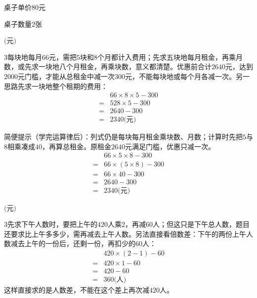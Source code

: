 \documentclass[multi=snippet,border={5bp 20bp 5bp 5bp}]{standalone}
\newenvironment{snippet}[3]{\begin{minipage}{#1bp}\color{answerred}\fontsize{#2}{#3}\selectfont\raggedright}{\end{minipage}}
\begin{document}
\begin{snippet}{72.29999999999995}{8.5}{12.8}\SourceSans\setlength{\mathindent}{2bp}桌子单价\(80\)元\end{snippet}
\begin{snippet}{71.29999999999995}{8.5}{12.8}\SourceSans\setlength{\mathindent}{2bp}桌子数量\(2\)张\end{snippet}
\begin{snippet}{80}{10.0}{14}\SourceSans\setlength{\mathindent}{2bp}\(\text{(元)}\)\end{snippet}
\begin{snippet}{505}{11.5}{14}\begin{multicols}{3}\raggedcolumns 每块地每月\(66\)\allowbreak 元，需把\(5\)\allowbreak 块和\(8\)\allowbreak 个月都计入费用；先求五块地每月租金，再乘月数，或先求一块地八个月租金，再乘块数，意义都清楚。优惠前合计\(2640\)\allowbreak 元，达到\(2000\)\allowbreak 元门槛，才能从总租金中减一次\(300\)\allowbreak 元，不能每块地或每个月各减一次。另一思路先求一块地整个租期的费用：\[\begin{aligned}&66\times8\times5-300\\={}&528\times5-300\\={}&2640-300\\={}&2340\text{(元)}\end{aligned}\]\par 简便提示（学完运算律后）：列式仍是每块每月租金乘块数、月数；计算时先把\(5\)\allowbreak 与\(8\)\allowbreak 相乘凑成\(40\)\allowbreak ，再算总租金。原租金\(2640\)\allowbreak 元满足门槛，优惠只减一次。\[\begin{aligned}&66\times5\times8-300\\={}&66\times(5\times8)-300\\={}&66\times40-300\\={}&2640-300\\={}&2340\text{(元)}\end{aligned}\]\end{multicols}\end{snippet}
\begin{snippet}{80}{10.0}{14}\SourceSans\setlength{\mathindent}{2bp}\(\text{(元)}\)\end{snippet}
\begin{snippet}{505}{11.5}{14}\begin{multicols}{3}\raggedcolumns 先求下午人数时，要把上午的\(420\)\allowbreak 人乘\(2\)\allowbreak ，再减\(60\)\allowbreak 人；但这只是下午总人数，题目还要求比上午多多少，需再减去上午人数。另法直接看倍数差：下午的两份上午人数减去上午的一份后，还剩一份，再扣少的\(60\)\allowbreak 人：\[\begin{aligned}&420\times(2-1)-60\\={}&420\times1-60\\={}&420-60\\={}&360\text{(人)}\end{aligned}\]这样直接求的是人数差，不能在这个差上再次减\(420\)\allowbreak 人。\end{multicols}\end{snippet}
\end{document}
